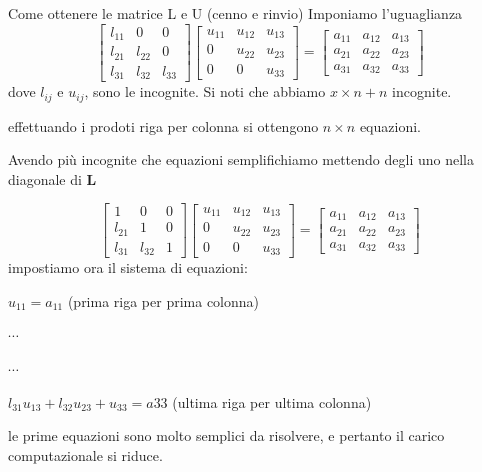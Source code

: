 \begin{frame}{Come ottenere le matrice L e U (cenno e rinvio)}
\label{come-ottenere-le-matrice-l-e-u-cenno-e-rinvio}
Imponiamo l'uguaglianza \[
\left[
\begin{array}{ccc}
l_{11}&0&0\\
l_{21}&l_{22}&0\\
l_{31}&l_{32}&l_{33}
\end{array}
\right]
\left[
\begin{array}{ccc}
u_{11}&u_{12}&u_{13}\\
0&u_{22}&u_{23}\\
0&0&u_{33}
\end{array}
\right]=
\left[
\begin{array}{ccc}
a_{11}&a_{12}&a_{13}\\
a_{21}&a_{22}&a_{23}\\
a_{31}&a_{32}&a_{33}
\end{array}
\right]
\] dove \(l_{ij}\) e \(u_{ij}\), sono le incognite. Si noti che abbiamo
\(x\times n +n\) incognite.

effettuando i prodoti riga per colonna si ottengono \(n\times n\)
equazioni.

Avendo più incognite che equazioni semplifichiamo mettendo degli uno
nella diagonale di \(\mathbf{L}\)
\end{frame}

\begin{frame}{}
\label{section}
\[
\left[
\begin{array}{ccc}
1&0&0\\
l_{21}&1&0\\
l_{31}&l_{32}&1
\end{array}
\right]
\left[
\begin{array}{ccc}
u_{11}&u_{12}&u_{13}\\
0&u_{22}&u_{23}\\
0&0&u_{33}
\end{array}
\right]=
\left[
\begin{array}{ccc}
a_{11}&a_{12}&a_{13}\\
a_{21}&a_{22}&a_{23}\\
a_{31}&a_{32}&a_{33}
\end{array}
\right]
\] impostiamo ora il sistema di equazioni:

\vskip5mm

\(u_{11}=a_{11}\) (prima riga per prima colonna)

\(\cdots\)

\(\cdots\)

\(l_{31}u_{13}+l_{32}u_{23}+u_{33}=a33\) (ultima riga per ultima
colonna)

\vskip5mm

le prime equazioni sono molto semplici da risolvere, e pertanto il
carico computazionale si riduce.
\end{frame}


